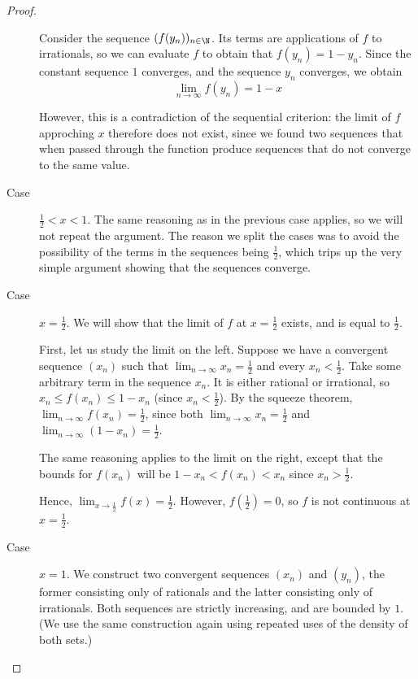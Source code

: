 \documentclass[letterpaper,11pt]{article}
\newcommand{\half}{\frac{1}{2}}
\begin{document}
\begin{proof}
\begin{description}
            Consider the sequence $(f(y_n))_{n\in\N}$. Its terms are
            applications of $f$ to irrationals, so we can evaluate $f$ to
            obtain that $f(y_n) = 1 - y_n$. Since the constant sequence $1$
            converges, and the sequence $y_n$ converges, we obtain
            \begin{equation*}
                \lim_{n\to\infty} f(y_n) = 1 - x
            \end{equation*}

            However, this is a contradiction of the sequential criterion: the
            limit of $f$ approching $x$ therefore does not exist, since we
            found two sequences that when passed through the function produce
            sequences that do not converge to the same value.

        \item[Case] $\half < x < 1$.
            The same reasoning as in the previous case applies, so we will not
            repeat the argument. The reason we split the cases was to avoid the
            possibility of the terms in the sequences being $\half$, which
            trips up the very simple argument showing that the sequences
            converge.

        \item[Case] $x = \half$.
            We will show that the limit of $f$ at $x = \half$ exists, and is
            equal to $\half$.

            First, let us study the limit on the left. Suppose we have a
            convergent sequence $(x_n)$ such that
            $\lim_{n\to\infty} x_n = \half$ and every $x_n < \half$. Take some
            arbitrary term in the sequence $x_n$. It is either rational or
            irrational, so $x_n \leq f(x_n) \leq 1 - x_n$
            (since $x_n < \half$).
            By the squeeze theorem, $\lim_{n\to\infty} f(x_n) = \half$, since
            both $\lim_{n\to\infty} x_n = \half$
            and $\lim_{n\to\infty} (1 - x_n) = \half$.

            The same reasoning applies to the limit on the right, except that
            the bounds for $f(x_n)$ will be $1 - x_n < f(x_n) < x_n$ since
            $x_n > \half$.

            Hence, $\lim_{x \to \half} f(x) = \half$. However, $f(\half) = 0$,
            so $f$ is not continuous at $x = \half$.

        \item[Case] $x = 1$.
            We construct two convergent sequences $(x_n)$ and $(y_n)$, the
            former consisting only of rationals and the latter consisting only
            of irrationals. Both sequences are strictly increasing, and are
            bounded by $1$. (We use the same construction again using repeated
            uses of the density of both sets.)


\end{description}
\end{proof}
\end{document}
